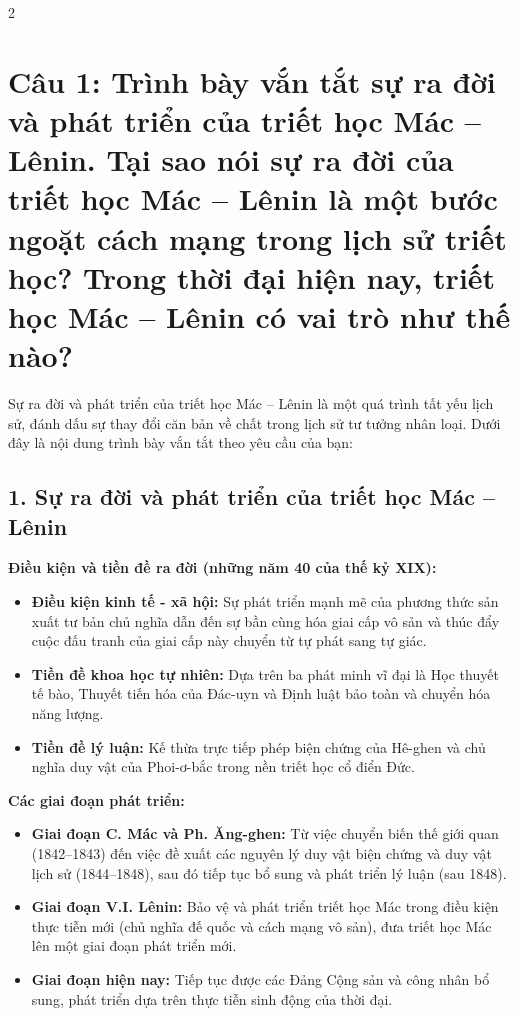\documentclass[9pt,a4paper]{extarticle}
\begin{document}
\small
\begin{multicols*}{2}

\section*{Câu 1: Trình bày vắn tắt sự ra đời và phát triển của triết học Mác -- Lênin. Tại sao nói sự ra đời của triết học Mác -- Lênin là một bước ngoặt cách mạng trong lịch sử triết học? Trong thời đại hiện nay, triết học Mác -- Lênin có vai trò như thế nào?}

Sự ra đời và phát triển của triết học Mác -- Lênin là một quá trình tất yếu lịch sử, đánh dấu sự thay đổi căn bản về chất trong lịch sử tư tưởng nhân loại. Dưới đây là nội dung trình bày vắn tắt theo yêu cầu của bạn:

\subsection*{1. Sự ra đời và phát triển của triết học Mác -- Lênin}

\textbf{Điều kiện và tiền đề ra đời (những năm 40 của thế kỷ XIX):}

\begin{itemize}
\item \textbf{Điều kiện kinh tế - xã hội:} Sự phát triển mạnh mẽ của phương thức sản xuất tư bản chủ nghĩa dẫn đến sự bần cùng hóa giai cấp vô sản và thúc đẩy cuộc đấu tranh của giai cấp này chuyển từ tự phát sang tự giác.
\item \textbf{Tiền đề khoa học tự nhiên:} Dựa trên ba phát minh vĩ đại là Học thuyết tế bào, Thuyết tiến hóa của Đác-uyn và Định luật bảo toàn và chuyển hóa năng lượng.
\item \textbf{Tiền đề lý luận:} Kế thừa trực tiếp phép biện chứng của Hê-ghen và chủ nghĩa duy vật của Phoi-ơ-bắc trong nền triết học cổ điển Đức.
\end{itemize}

\textbf{Các giai đoạn phát triển:}

\begin{itemize}
\item \textbf{Giai đoạn C. Mác và Ph. Ăng-ghen:} Từ việc chuyển biến thế giới quan (1842--1843) đến việc đề xuất các nguyên lý duy vật biện chứng và duy vật lịch sử (1844--1848), sau đó tiếp tục bổ sung và phát triển lý luận (sau 1848).
\item \textbf{Giai đoạn V.I. Lênin:} Bảo vệ và phát triển triết học Mác trong điều kiện thực tiễn mới (chủ nghĩa đế quốc và cách mạng vô sản), đưa triết học Mác lên một giai đoạn phát triển mới.
\item \textbf{Giai đoạn hiện nay:} Tiếp tục được các Đảng Cộng sản và công nhân bổ sung, phát triển dựa trên thực tiễn sinh động của thời đại.
\end{itemize}


\end{multicols*}
\end{document}
